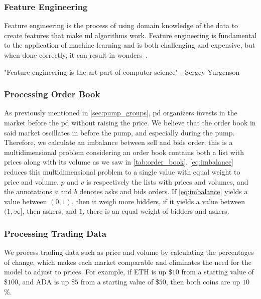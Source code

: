 

\subsubsection{Feature Engineering}
Feature engineering is the process of using domain knowledge of the data to create features that make \ac{ml} algorithms work. Feature engineering is fundamental to the application of machine learning and is both challenging and expensive, but when done correctly, it can result in wonders~\cite{feature_engin}.

\begin{displayquote}
    \begin{em}
        "Feature engineering is the art part of computer science" - Sergey Yurgenson
    \end{em}
\end{displayquote}
 
\subsubsection{Processing Order Book}
As previously mentioned in \autoref{sec:pump_groups}, \ac{pd} organizers invests in the market before the \ac{pd} without raising the price. We believe that the order book in said market oscillates in before the pump, and especially during the pump. Therefore, we calculate an imbalance between sell and bids order; this is a multidimensional problem considering an order book contains both a list with prices along with its volume as we saw in \autoref{tab:order_book}. \autoref{eq:imbalance} reduces this multidimensional problem to a single value with equal weight to price and volume. $p$ and $v$ is respectively the lists with prices and volumes, and the annotations $a$ and $b$ denotes asks and bids orders. If \autoref{eq:imbalance} yields a value between $(0,1)$, then it weigh more bidders, if it yields a value between $(1, \infty]$, then askers, and $1$, there is an equal weight of bidders and askers.



\subsubsection{Processing Trading Data}
We process trading data such as price and volume by calculating the percentages of change, which makes each market comparable and eliminates the need for the model to adjust to prices. For example, if ETH is up \$$10$ from a starting value of \$$100$, and ADA is up \$$5$ from a starting value of \$$50$, then both coins are up $10$\%.

